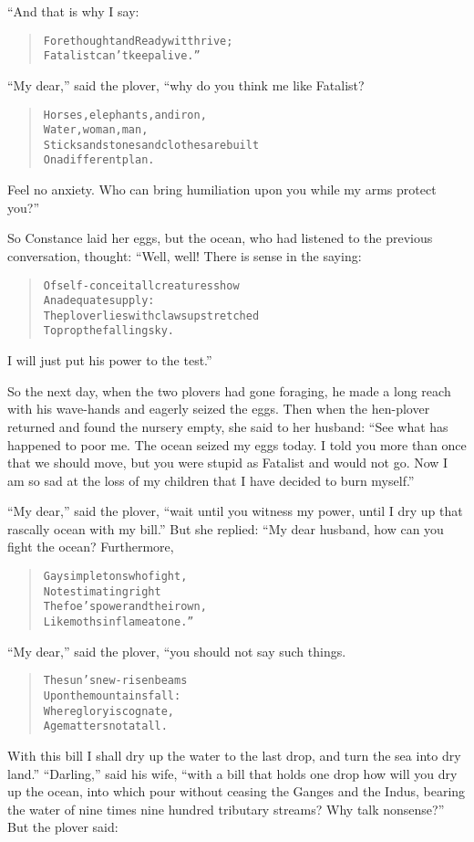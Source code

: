 \documentclass[article, twoside, 14pt]{memoir}
\renewenvironment{verbatim}{%
\begin{quote}%
\vskip -10pt%
\begin{alltt}\normalfont\large}{\end{alltt}%
\end{quote}%
\vskip -10pt
} %
\begin{document}
“And that is why I say:

\begin{verbatim}
Forethought and Readywit thrive;
Fatalist can't keep alive.”
\end{verbatim}
``My dear,'' said the plover, “why do you think me like Fatalist?

\begin{verbatim}
Horses, elephants, and iron,
Water, woman, man,
Sticks and stones and clothes are built
On a different plan.
\end{verbatim}
Feel no anxiety. Who can bring humiliation upon you while my
arms protect you?”

So Constance laid her eggs, but the ocean, who had listened to the
previous conversation, thought: “Well, well! There is sense in the
saying:

\begin{verbatim}
Of self-conceit all creatures show
    An adequate supply:
The plover lies with claws upstretched
    To prop the falling sky.
\end{verbatim}
I will just put his power to the test.”

So the next day, when the two plovers had gone foraging, he made a
long reach with his wave-hands and eagerly seized the eggs. Then
when the hen-plover returned and found the nursery empty, she said
to her husband:
``See what has happened to poor me. The ocean seized my eggs today. I told you more than once that we should move, but you were stupid as Fatalist and would not go. Now I am so sad at the loss of my children that I have decided to burn myself.''

``My dear,'' said the plover,
``wait until you witness my power, until I dry up that rascally ocean with my bill.''
But she replied: “My dear husband, how can you fight the ocean?
Furthermore,

\begin{verbatim}
Gay simpletons who fight,
Not estimating right
The foe's power and their own,
Like moths in flame atone.”
\end{verbatim}
``My dear,'' said the plover, “you should not say such things.

\begin{verbatim}
The sun's new-risen beams
Upon the mountains fall:
Where glory is cognate,
Age matters not at all.
\end{verbatim}
With this bill I shall dry up the water to the last drop, and turn
the sea into dry land.” ``Darling,'' said his wife,
``with a bill that holds one drop how will you dry up the ocean, into which pour without ceasing the Ganges and the Indus, bearing the water of nine times nine hundred tributary streams? Why talk nonsense?''
But the plover said:
\end{document}
